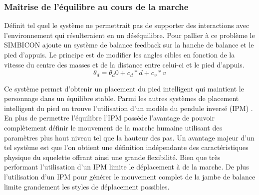 \documentclass{llncs}
\begin{document}
\subsubsection{Maîtrise de l'équilibre au cours de la marche}
Définit tel quel le système ne permettrait pas de supporter des interactions avec l'environnement qui résulteraient en un déséquilibre. Pour pallier à ce problème le SIMBICON ajoute un système de balance feedback sur la hanche de balance et le pied d'appuis. Le principe est de modifier les angles cibles en fonction de la vitesse du centre des masses et de la distance entre celui-ci et le pied d'appuis. 
\[
\theta_d=\theta_d0 + c_d*d + c_v*v 
\]

Ce système permet d'obtenir un placement du pied intelligent qui maintient le personnage dans un équilibre stable. Parmi les autres systèmes de placement intelligent du pied on trouve l'utilisation d'un modèle du pendule inversé (IPM) \cite{kajita20013d,coros2010generalized}. En plus de permettre l'équilibre l'IPM possède l'avantage de pouvoir complètement définir le mouvement de la marche humaine utilisant des paramètres plus haut niveau tel que la hauteur des pas. Un avantage majeur d'un tel système est que l'on obtient une définition indépendante des caractéristiques physique du squelette offrant ainsi une grande flexibilité. Bien que très performant l'utilisation d'un IPM limite le déplacement à de la marche. De plus l'utilisation d'un IPM pour générer le mouvement complet de la jambe de balance limite grandement les styles de déplacement possibles.
\end{document}
